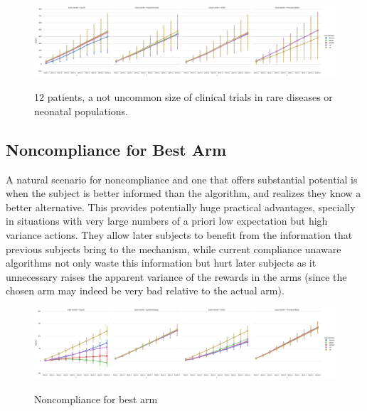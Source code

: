 \begin{figure}[t]
	\centering	
	\includegraphics[width=1.5\columnwidth, angle=90]{bandit/figs/ex3.png}\hspace{1cm}
	\label{fig:ex3}
	\caption{12 patients, a not uncommon size of clinical trials in rare diseases or neonatal populations.}
\end{figure}





\subsection{Noncompliance for Best Arm}


A natural scenario for noncompliance and one that offers substantial potential is when the subject is better informed than the algorithm, and realizes they know a better alternative. 
This provides potentially huge practical advantages, specially in situations with very large numbers of a priori low expectation but high variance actions. 
They allow later subjects to benefit from the information that previous subjects bring to the mechanism, while current compliance unaware algorithms not only waste this information but hurt later subjects as it unnecessary raises the apparent variance of the rewards in the arms (since the chosen arm may indeed be very bad relative to the actual arm).




\begin{figure}[t]
	\centering	
	\includegraphics[width=1.5\textwidth, angle=90]{bandit/figs/ex4.png}\hspace{1cm}
	\label{fig:ex4}
	\caption{Noncompliance for best arm}
\end{figure}




